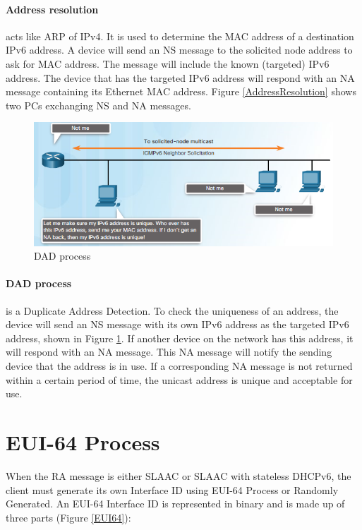 \paragraph{Address resolution} acts like ARP of IPv4. It is used to determine the MAC address of a destination IPv6 address. A device will send an NS message to the solicited node address to ask for MAC address. The message will include the known (targeted) IPv6 address. The device that has the targeted IPv6 address will respond with an NA message containing its Ethernet MAC address. Figure \ref{AddressResolution} shows two PCs exchanging NS and NA messages.

\begin{figure}[hbtp]
\caption{DAD process}\label{DADprocess}
\centering
\includegraphics[scale=1]{pictures/DADprocess.PNG}
\end{figure}


\paragraph{DAD process} is a Duplicate Address Detection.  To check the uniqueness of an address, the device will send an NS message with its own IPv6 address as the targeted IPv6 address, shown in Figure \ref{DADprocess}. If another device on the network has this address, it will respond with an NA message. This NA message will notify the sending device that the address is in use. If a corresponding NA message is not returned within a certain period of time, the unicast address is unique and acceptable for use.



\section{EUI-64 Process}

When the RA message is either SLAAC or SLAAC with stateless DHCPv6, the client must generate its own Interface ID using EUI-64 Process or Randomly Generated. An EUI-64 Interface ID is represented in binary and is made up of three parts (Figure \ref{EUI64}):

